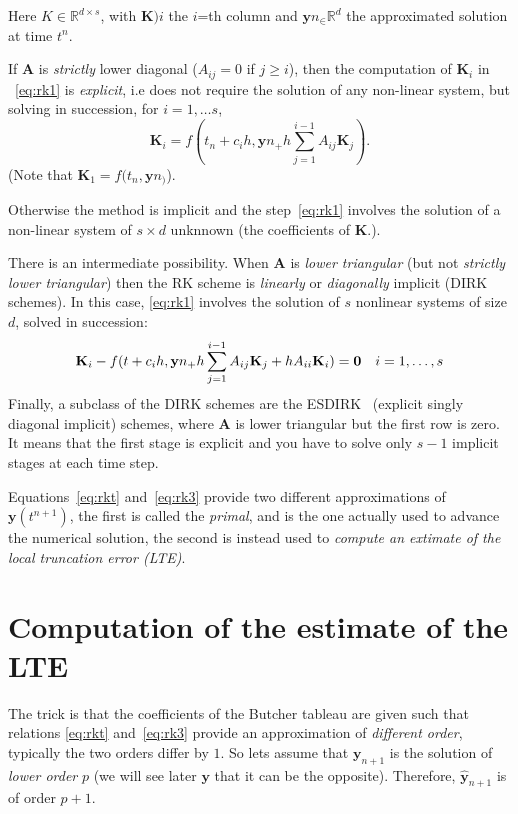 \documentclass[10pt,a4paper,twoside]{article}
\begin{document}
Here $K\in\mathbb{R}^{d\times s}$, with $\mathbf{K})i$ the $i$=th column and $\mathbf{y}n_\in\mathbb{R}^d$ the approximated solution at time $t^n$.

If $\mathbf{A}$ is \emph{strictly} lower diagonal ($A_{ij}=0$ if $j\ge i$), then the  computation of $\mathbf{K}_i$ in ~\eqref{eq:rk1} is \emph{explicit}, i.e does not require the solution of any non-linear system, but solving in succession, for $i=1,\ldots s$,
\[
\mathbf{K}_i = f(t_n+c_ih,\mathbf{y}n_+h\sum_{j=1}^{i-1} A_{ij}\mathbf{K}_j).
\]
(Note that $\mathbf{K}_1=f(t_n,\mathbf{y}n_)$).

Otherwise the method is implicit and the step~\eqref{eq:rk1} involves the solution of a non-linear system of $s\times d$ unknnown (the coefficients of $\mathbf{K}$.).

There is an intermediate possibility. When $\mathbf{A}$ is \emph{lower triangular} (but not \emph{strictly lower triangular}) then the RK scheme is \emph{linearly} or \emph{diagonally} implicit
(DIRK schemes). In this case, \eqref{eq:rk1} involves the solution of $s$ nonlinear systems of size $d$, solved in succession:
\[
\mathbf{K}_i - f(t+c_ih,\mathbf{y}n_+h\sum_{j=1}^{i-1} A_{ij}\mathbf{K}_j +hA_{ii}\mathbf{K}_i)=\mathbf{0}\quad i=1,\ldots,s\\\label{eq:rk2ex}
\]
Finally, a subclass of the DIRK schemes are the ESDIRK~\cite{jorgensenFamilyESDIRKIntegration2018} (explicit singly diagonal implicit) 
schemes, where $\mathbf{A}$ is lower triangular but the first row is zero. It means that the first stage is explicit and you have to solve only $s-1$ implicit stages at each time step. 
\smallskip

Equations~\eqref{eq:rkt} and~\eqref{eq:rk3} provide two different approximations of $\mathbf{y}(t^{n+1})$, the first is called the \emph{primal}, and is the one actually used to advance the numerical solution, the second is instead used to \emph{compute an extimate of the local truncation error (LTE)}.
\section{Computation of the estimate of the LTE}
The trick is that the coefficients of the Butcher tableau are given such that relations \eqref{eq:rkt} and~\eqref{eq:rk3} provide an approximation of \emph{different order}, typically the two orders differ by $1$. So lets assume that $\mathbf{y}_{n+1}$ is the solution of \emph{lower order} $p$ (we will see later $\mathbf{y}$ that it can be the opposite). Therefore, $\hat{\mathbf{y}}_{n+1}$ is of order $p+1$. 
\end{document}
